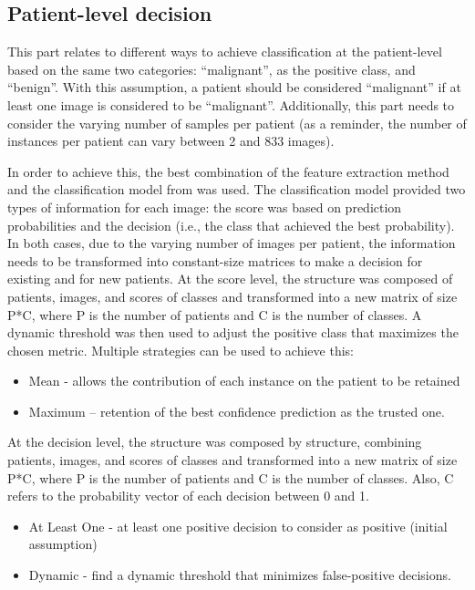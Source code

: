 \documentclass[journal,article,submit,moreauthors,pdftex, applsci]{Definitions/mdpi}
\begin{document}
\subsection{Patient-level decision}
\label{sec:patient_decision}
This part relates to different ways to achieve classification at the patient-level based on the same two categories: “malignant”, as the positive class, and “benign”. With this assumption, a patient should be considered “malignant” if at least one image is considered to be “malignant”. Additionally, this part needs to consider the varying number of samples per patient (as a reminder, the number of instances per patient can vary between 2 and 833 images).\par
In order to achieve this, the best combination of the feature extraction method and the classification model from  was used. The classification model provided two types of information for each image: the score was based on prediction probabilities and the decision (i.e., the class that achieved the best probability). In both cases, due to the varying number of images per patient, the information needs to be transformed into constant-size matrices to make a decision for existing and for new patients. At the score level, the structure was composed of patients, images, and scores of classes and transformed into a new matrix of size P*C, where P is the number of patients and C is the number of classes. A dynamic threshold was then used to adjust the positive class that maximizes the chosen metric. Multiple strategies can be used to achieve this:
\begin{itemize}
\item Mean - allows the contribution of each instance on the patient to be retained
\item Maximum – retention of the best confidence prediction as the trusted one.
\end{itemize}
At the decision level, the structure was composed by structure, combining patients, images, and scores of classes and transformed into a new matrix of size P*C, where P is the number of patients and C is the number of classes. Also, C refers to the probability vector of each decision between 0 and 1.
\begin{itemize}
\item At Least One - at least one positive decision to consider as positive (initial assumption)
\item Dynamic - find a dynamic threshold that minimizes false-positive decisions.
\end{itemize}
\end{document}
